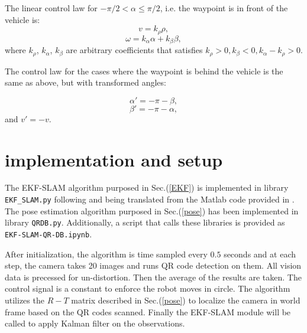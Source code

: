 \documentclass[12pt]{article}
\begin{document}
The linear control law for $-\pi/2<\alpha\le \pi/2$, i.e. the waypoint is in front of the vehicle is:
$$v=k_\rho \rho,$$
$$\omega=k_\alpha \alpha+k_\beta \beta,$$
where $k_\rho$, $k_\alpha$, $k_\beta$ are arbitrary coefficients that satisfies $k_\rho>0, k_\beta<0,k_\alpha-k_\rho>0.$

The control law for the cases where the waypoint is behind the vehicle is the same as above, but with transformed angles:

$$\alpha'=-\pi-\beta,$$
$$\beta'=-\pi-\alpha,$$
and $v'=-v$.

%


\section{implementation and setup}

The EKF-SLAM algorithm purposed in Sec.(\ref{EKF}) is implemented in library \texttt{EKF\_SLAM.py} following and being translated from the Matlab code provided in \cite{ekf}. The pose estimation algorithm purposed in Sec.(\ref{pose}) has been implemented in library \texttt{QRDB.py}.  Additionally, a script that calls these libraries is provided as \texttt{EKF-SLAM-QR-DB.ipynb}. 

After initialization, the algorithm is time sampled every $0.5$ seconds and at each step, the camera takes 20 images and runs QR code detection on them. All vision data is precessed for un-distortion. Then the average of the results are taken. The control signal is a constant to enforce the robot moves in circle. The algorithm utilizes the $R-T$ matrix described in Sec.(\ref{pose}) to localize the camera in world frame based on the QR codes scanned.  Finally the EKF-SLAM module will be called to apply Kalman filter on the observations.
\end{document}
